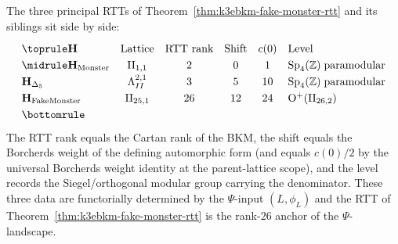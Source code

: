 \begin{remark}
\label{rem:k3ebkm-rtt-comparison}
The three principal RTTs of Theorem~\ref{thm:k3ebkm-fake-monster-rtt}
and its siblings sit side by side:
\[
 \renewcommand{\arraystretch}{1.25}
 \begin{array}{@{}lccccl@{}}
 \toprule
 \mathbf H & \text{Lattice} & \text{RTT rank} & \text{Shift} & c(0) & \text{Level} \\
 \midrule
 \mathbf H_{\mathrm{Monster}} & \mathrm{II}_{1,1} & 2 & 0 & 1 & \mathrm{Sp}_4(\mathbb Z)\;\mathrm{paramodular} \\
 \mathbf H_{\Delta_5} & \Lambda^{2,1}_{II} & 3 & 5 & 10 & \mathrm{Sp}_4(\mathbb Z)\;\mathrm{paramodular} \\
 \mathbf H_{\mathrm{FakeMonster}} & \mathrm{II}_{25,1} & 26 & 12 & 24 & \mathrm{O}^+(\mathrm{II}_{26,2}) \\
 \bottomrule
 \end{array}
\]
The RTT rank equals the Cartan rank of the BKM, the shift equals the
Borcherds weight of the defining automorphic form (and equals
$c(0)/2$ by the universal Borcherds weight identity at the
parent-lattice scope), and the level records the Siegel/orthogonal
modular group carrying the denominator. These three data are
functorially determined by the $\Psi$-input $(L,\phi_L)$ and the
RTT of Theorem~\ref{thm:k3ebkm-fake-monster-rtt} is the rank-$26$
anchor of the $\Psi$-landscape.
\end{remark}


